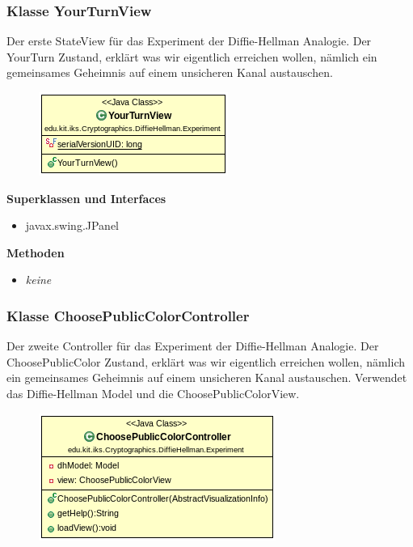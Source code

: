 \documentclass{article}
\begin{document}
\subsubsection{Klasse YourTurnView}
      Der erste StateView für das Experiment der Diffie-Hellman Analogie.
      Der YourTurn Zustand, erklärt was wir eigentlich erreichen wollen,
      nämlich ein gemeinsames Geheimnis auf einem unsicheren Kanal austauschen.

      \begin{figure}[H]
        \centering
        \includegraphics{resources/edu-kit-iks-Cryptographics-DiffieHellman-Experiment-YourTurnView}
      \end{figure}

      \textbf{Superklassen und Interfaces}
      \begin{itemize}
        \item javax.swing.JPanel
      \end{itemize}

      \textbf{Methoden}
      \begin{itemize}
        \item \textit{keine}
      \end{itemize}

\subsubsection{Klasse ChoosePublicColorController}
      Der zweite Controller für das Experiment der Diffie-Hellman Analogie.
      Der ChoosePublicColor Zustand, erklärt was wir eigentlich erreichen wollen,
      nämlich ein gemeinsames Geheimnis auf einem unsicheren Kanal austauschen.
      Verwendet das Diffie-Hellman Model und die ChoosePublicColorView.

      \begin{figure}[H]
        \centering
        \includegraphics{resources/edu-kit-iks-Cryptographics-DiffieHellman-Experiment-ChoosePublicColorController}
      \end{figure}
\end{document}
